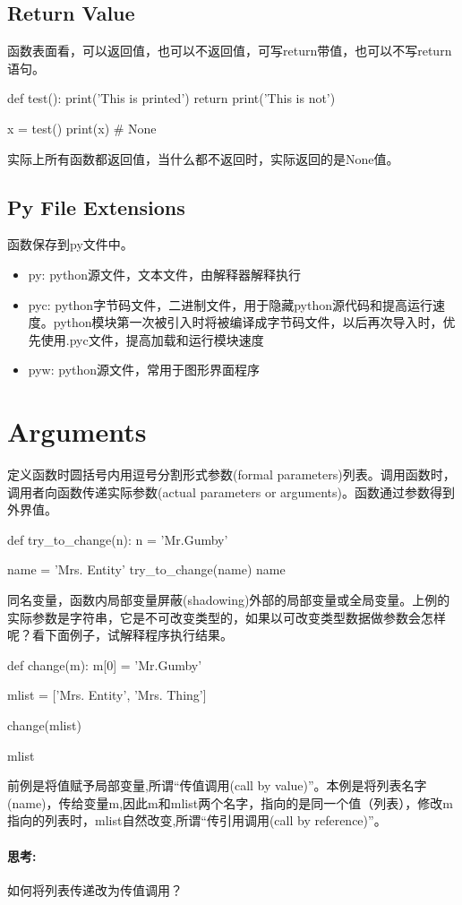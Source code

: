 \subsection{Return Value}
函数表面看，可以返回值，也可以不返回值，可写return带值，也可以不写return语句。
\begin{python}
def test():
    print('This is printed')
    return
    print('This is not')

x = test()
print(x)  # None
\end{python}
实际上所有函数都返回值，当什么都不返回时，实际返回的是None值。
\subsection{Py File Extensions}
函数保存到py文件中。
\begin{itemize}
\item py: python源文件，文本文件，由解释器解释执行
\item pyc: python字节码文件，二进制文件，用于隐藏python源代码和提高运行速度。python模块第一次被引入时将被编译成字节码文件，以后再次导入时，优先使用.pyc文件，提高加载和运行模块速度
\item pyw: python源文件，常用于图形界面程序
\end{itemize}
\section{Arguments}
定义函数时圆括号内用逗号分割形式参数(formal parameters)列表。调用函数时，调用者向函数传递实际参数(actual parameters or arguments)。函数通过参数得到外界值。
\begin{python}
def try_to_change(n):
    n = 'Mr.Gumby'

name = 'Mrs. Entity'
try_to_change(name)
name
\end{python}
同名变量，函数内局部变量屏蔽(shadowing)外部的局部变量或全局变量。上例的实际参数是字符串，它是不可改变类型的，如果以可改变类型数据做参数会怎样呢？看下面例子，试解释程序执行结果。
\begin{python}
def change(m):
    m[0] = 'Mr.Gumby'

mlist = ['Mrs. Entity', 'Mrs. Thing']

change(mlist)

mlist
\end{python}
前例是将值赋予局部变量,所谓“传值调用(call by value)”。本例是将列表名字(name)，传给变量m,因此m和mlist两个名字，指向的是同一个值（列表），修改m指向的列表时，mlist自然改变,所谓“传引用调用(call by reference)”。
\paragraph{思考: }  如何将列表传递改为传值调用？

